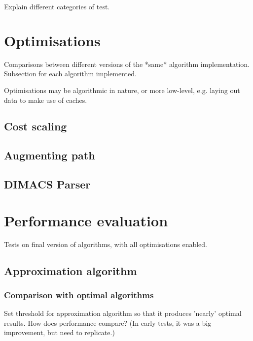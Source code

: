 Explain different categories of test.

\section{Optimisations} \label{sec:eval-optimisations}

Comparisons between different versions of the *same* algorithm implementation. Subsection for each algorithm implemented.

Optimisations may be algorithmic in nature, or more low-level, e.g. laying out data to make use of caches.

\subsection{Cost scaling}


\subsection{Augmenting path}

\subsection{DIMACS Parser}

\section{Performance evaluation}

Tests on final version of algorithms, with all optimisations enabled.

\subsection{Approximation algorithm} \label{sec:eval-approx}


\subsubsection{Comparison with optimal algorithms}

Set threshold for approximation algorithm so that it produces 'nearly' optimal results. How does performance compare? (In early tests, it was a big improvement, but need to replicate.)

